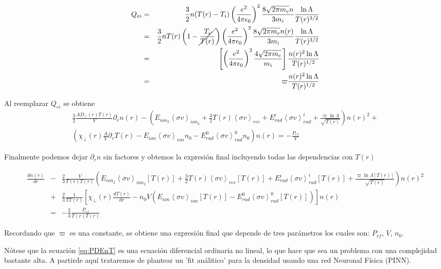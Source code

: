   \begin{eqnarray}
    Q_{ei} &=& \frac{3}{2}n(T(r) - T_i) \left(\frac{e^2}{4\pi\epsilon_0}\right)^2\frac{8\sqrt{2\pi m_e}n}{3 m_i}\frac{\ln{\Lambda}}{T(r)^{3/2}} \nonumber \\
           &=& \frac{3}{2}nT(r)\left(1 - \cancel{\frac{T_i}{T(r)}}\right) \left(\frac{e^2}{4\pi\epsilon_0}\right)^2\frac{8\sqrt{2\pi m_e}n(r)}{3 m_i}\frac{\ln{\Lambda}}{T(r)^{3/2}} \nonumber \\
           &=& \left[\left(\frac{e^2}{4\pi\epsilon_0}\right)^2\frac{4\sqrt{2\pi m_e}}{m_i}\right]\frac{n(r)^2\ln{\Lambda}}{T(r)^{1/2}} \nonumber \\
           &=& \varpi\frac{n(r)^2\ln{\Lambda}}{T(r)^{1/2}}
  \end{eqnarray}

  Al reemplazar $Q_{ei}$ se obtiene
  \begin{eqnarray*}
    \frac{3}{2}\frac{AD_\perp(r) T(r)}{V}\partial_r n(r) - \left(E_{ion_2}\left<\sigma v\right>_{ion_2} + \frac{3}{2}T(r)\left<\sigma v\right>_{rec} + E_{rad}^i\left<\sigma v\right>_{rad}^i + \frac{\varpi \ln{\Lambda}}{\sqrt{T(r)}}\right)n(r)^2 + \\ \left(\chi_\perp(r)\frac{A}{V}\partial_r T(r) - E_{ion}\left<\sigma v\right>_{ion}n_0 - E_{rad}^0\left<\sigma v\right>_{rad}^0n_0\right)n(r) = - \frac{P_{rf}}{V}
  \end{eqnarray*}

  Finalmente podemos dejar $\partial_r n$ sin factores y obtemos la expresi\'on final incluyendo todas las dependencias con $T(r)$

  \begin{eqnarray}\label{eq:PDEnT}
    \frac{dn(r)}{dr} &-& \frac{2}{3}\frac{V}{\varUpsilon(r) T(r)}\left(E_{ion_2}\left<\sigma v\right>_{ion_2}[T(r)] + \frac{3}{2}T(r)\left<\sigma v\right>_{rec}[T(r)] + E_{rad}^i\left<\sigma v\right>_{rad}^i[T(r)] + \frac{\varpi\ln{\Lambda}[T(r)]}{\sqrt{T(r)}}\right)n(r)^2  \nonumber\\ &+& \frac{2}{3}\frac{1}{\varUpsilon T(r)}\left[\chi_\perp(r)\frac{dT(r)}{dr} - n_0V\left(E_{ion}\left<\sigma v\right>_{ion}[T(r)] - E_{rad}^0\left<\sigma v\right>_{rad}^0[T(r)]\right)\right]n(r) \nonumber\\ &=& -\frac{2}{3}\frac{P_{rf}}{\varUpsilon(r) T(r)}
  \end{eqnarray}

  Recordando que $\varpi$ es una constante, se obtiene una expresi\'on final que depende de tres par\'ametros los cuales son: $P_{rf}$, $V$, $n_0$. 

  N\'otese que la ecuaci\'on \eqref{eq:PDEnT} es una ecuaci\'on diferencial ordinaria no lineal, lo que hace que sea un problema con una complejidad bastante alta. A partirde aqu\'i trataremos de plantear un 'fit an\'alitico' para la densidad usando una red Neuronal F\'isica (PINN). 
